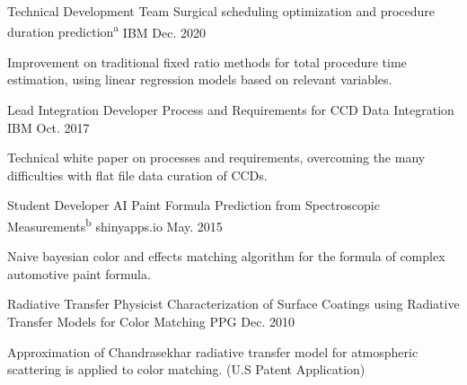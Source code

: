

\begin{cventries}

  \cventry
    {Technical Development Team} %
    {Surgical scheduling optimization and procedure duration prediction\textsuperscript{a}} %
    {IBM} %
    {Dec. 2020} %
    {
      \begin{cvcompactparagraph}
        Improvement on traditional fixed ratio methods for total procedure time estimation, using linear regression models based on relevant variables.
      \end{cvcompactparagraph}
    }

  \cventry
    {Lead Integration Developer} %
    {Process and Requirements for CCD Data Integration} %
    {IBM} %
    {Oct. 2017} %
    {
      \begin{cvcompactparagraph}
        Technical white paper on processes and requirements, overcoming the many difficulties with flat file data curation of CCDs.
      \end{cvcompactparagraph}
    }

  \cventry
    {Student Developer} %
    {AI Paint Formula Prediction from Spectroscopic Measurements\textsuperscript{b}} %
    {shinyapps.io} %
    {May. 2015} %
    {
      \begin{cvcompactparagraph}
        Naive bayesian color and effects matching algorithm for the formula of complex automotive paint formula.
      \end{cvcompactparagraph}
    }

  \cventry
    {Radiative Transfer Physicist} %
    {Characterization of Surface Coatings using Radiative Transfer Models for Color Matching} %
    {PPG} %
    {Dec. 2010} %
    {
      \begin{cvcompactparagraph}
        Approximation of Chandrasekhar radiative transfer model for atmospheric scattering is applied to color matching.  (U.S Patent Application)
      \end{cvcompactparagraph}
    }


\end{cventries}
